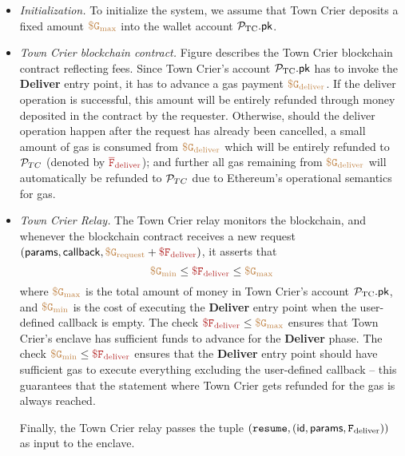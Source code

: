 \begin{itemize}[leftmargin=5mm]
\item
{\it Initialization.}
To initialize the system, we assume that Town Crier 
deposits a fixed amount $\tt {\color{brown} \$ G_{\text{max}} }$ 
into the wallet account ${\mathcal{P}}_{\text{TC}}.{\sf pk}$.
\item
{\it Town Crier blockchain contract.}
Figure  describes the  
Town Crier blockchain contract reflecting fees.
Since Town Crier's account 
${\mathcal{P}}_{\text{TC}}.{\sf pk}$ has to invoke the {\bf Deliver} entry point, it has
to advance 
a gas payment 
$\tt {\color{brown} \$ G_{\text{deliver}} }$.
If the deliver operation is successful, 
this amount will be entirely refunded through money deposited in the contract 
by the requester.
Otherwise, should the deliver operation happen after the request has already
been cancelled, 
a small amount of gas is consumed from $\tt {\color{brown} \$ G_{\text{deliver}} }$
which will be entirely refunded 
to ${\cal P}_{TC}$ (denoted by $\smaroon{\overline{F}_{\text{deliver}}}$); and further 
all gas remaining  
from $\tt {\color{brown} \$ G_{\text{deliver}} }$ will automatically 
be refunded to ${\cal P}_{TC}$ due to Ethereum's operational semantics for gas. 
\item
{\it Town Crier Relay.}
The Town Crier relay monitors
the blockchain, and whenever
the blockchain contract \tcont
receives a new request $({\sf params}, {\sf callback}, 
\sbrown{\$ G_{\text{request}}}+\smaroon{\$ F_{\text{deliver}}})$,
it asserts that 
\[
\sbrown{\$ G_{\text{min}}}
\leq \smaroon{\$ F_{\text{deliver}}} \leq \sbrown{\$ G_{\text{max}}}
\]
where $\tt {\color{brown} \$ G_{\text{max}} }$ is the total amount of money
in Town Crier's account ${\mathcal{P}}_{\text{TC}}.{\sf pk}$, 
and $\tt {\color{brown} \$ G_{\text{min}} }$
is the cost of executing the {\bf Deliver} entry point 
when the user-defined callback is empty.
The check 
$\smaroon{\$ F_{\text{deliver}}} \leq \sbrown{\$ G_{\text{max}}}$
ensures that Town Crier's enclave  
has sufficient funds to advance
for the {\bf Deliver} phase.
The check 
$\sbrown{\$ G_{\text{min}}}
\leq \smaroon{\$ F_{\text{deliver}}}$
ensures that 
the {\bf Deliver} entry point should 
have sufficient gas to execute everything excluding the user-defined
callback -- this guarantees that the statement
where Town Crier gets refunded for the gas is always reached.


Finally, the Town Crier relay passes
the tuple $({\tt resume}, 
({\sf id}, {\sf params}, 
{\tt F_{\text{deliver}}}
))$
as input to the enclave.



\end{itemize}
